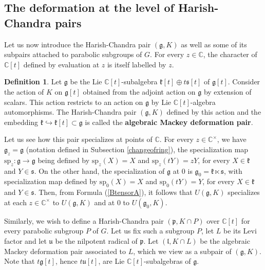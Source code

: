 \documentclass{amsart}
\theoremstyle{definition}
\newtheorem{definition}[theorem]{Definition}
\begin{document}
\subsection{The deformation at the level of Harish-Chandra pairs}\label{DeformationHCpairs} Let us now introduce the Harish-Chandra pair $(\bm{\mathfrak{g}},K)$ as well as some of its subpairs attached to parabolic subgroups of $G$. For every $z \in \mathbb{C}$, the character of $\mathbb{C}[t]$ defined by evaluation at $z$ is itself labelled by $z$.

\begin{definition}
    Let $\bm{\mathfrak{g}}$ be the Lie $\mathbb{C}[t]$-subalgebra $\mathfrak{k}[t] \oplus t\mathfrak{s}[t]$ of $\mathfrak{g}[t]$. Consider the action of $K$ on $\mathfrak{g}[t]$ obtained from the adjoint action on $\mathfrak{g}$ by extension of scalars. This action restricts to an action on $\bm{\mathfrak{g}}$ by Lie $\mathbb{C}[t]$-algebra automorphisms. The Harish-Chandra pair $(\bm{\mathfrak{g}},K)$ defined by this action and the embedding $\mathfrak{k} \hookrightarrow \mathfrak{k}[t] \subset \bm{\mathfrak{g}}$ is called the \textbf{algebraic Mackey deformation pair}.
\end{definition}

Let us see how this pair specializes at points of $\mathbb{C}$. For every $z \in \mathbb{C}^\times$, we have $\bm{\mathfrak{g}}_z = \mathfrak{g}$ (notation defined in Subsection \ref{changeofring}), the specialization map $\mathrm{sp}_z : \bm{\mathfrak{g}}\to \mathfrak{g}$ being defined by $\mathrm{sp}_z (X) = X$ and $\mathrm{sp}_z( tY) = zY$, for every $X \in \mathfrak{k}$ and $Y \in \mathfrak{s}$. On the other hand, the specialization of $\bm{\mathfrak{g}}$ at $0$ is $\mathfrak{g}_0 = \mathfrak{k} \ltimes \mathfrak{s}$, with specialization map defined by $\mathrm{sp}_0(X) = X$ and $\mathrm{sp}_0(tY) = Y$, for every $X \in \mathfrak{k}$ and $Y \in \mathfrak{s}$. Then, from Formula (\ref{BtensorA}), it follows that $U(\bm{\mathfrak{g}},K)$ specializes at each $z \in \mathbb{C}^\times$ to $U(\mathfrak{g},K)$ and at $0$ to $U(\mathfrak{g}_0,K)$.

Similarly, we wish to define a Harish-Chandra pair $(\bm{\mathfrak{p}},K\cap P)$ over $\mathbb{C}[t]$ for every parabolic subgroup $P$ of $G$. Let us fix such a subgroup $P$, let $L$ be its Levi factor and let $\mathfrak{u}$ be the nilpotent radical of $\mathfrak{p}$. Let $(\bm{\mathfrak{l}},K\cap L)$ be the algebraic Mackey deformation pair associated to $L$, which we view as a subpair of $(\bm{\mathfrak{g}},K)$. Note that $t\mathfrak{g}[t]$, hence $t\mathfrak{u}[t]$, are Lie $\mathbb{C}[t]$-subalgebras of $\bm{\mathfrak{g}}$.
\end{document}
